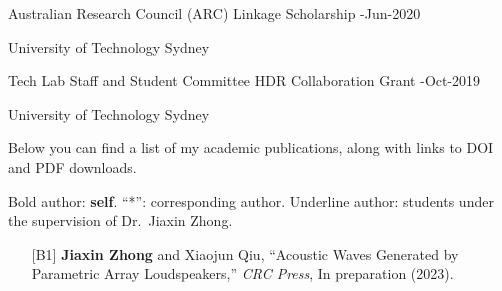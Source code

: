 \documentclass[10pt,a4paper,ragged2e,withhyper]{altacv}
\newcommand{\PubMe}[1]{\textbf{#1}}
\begin{document}
{\color{accent}Australian Research Council (ARC) Linkage Scholarship}
\hfill {}-Jun-2020
\par
University of Technology Sydney

\divider

{\color{accent}Tech Lab Staff and Student Committee HDR Collaboration Grant}
\hfill {}-Oct-2019
\par
University of Technology Sydney


\newpage
{}

Below you can find a list of my academic publications, along with links to {\color{accent}\aiDoi} DOI and {\color{accent}\faFilePdf[regular]} PDF downloads.

Bold author: \textbf{self}.
``*'': corresponding author.
Underline author: students under the supervision of Dr.\ Jiaxin Zhong.

\vspace{.5cm}


\begin{itemize}[leftmargin = 25pt]
    \justifying 
    \item[{[B1]}] \PubMe{Jiaxin Zhong} and Xiaojun Qiu, 
    ``Acoustic Waves Generated by Parametric Array Loudspeakers,'' 
    \textit{CRC Press}, In preparation (2023).
\end{itemize}

\divider


\end{document}
